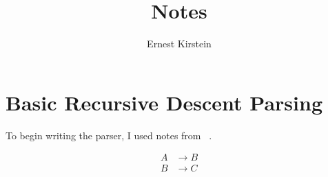 \documentclass[11pt]{article}
\begin{document}
\title{Notes}
\author{Ernest Kirstein}
\maketitle

\section*{Basic Recursive Descent Parsing}

To begin writing the parser, I used notes from ~\cite{lewis}.

\begin{align*}
A &\rightarrow B\\
B &\rightarrow C
\end{align*}

{}

\end{document}
